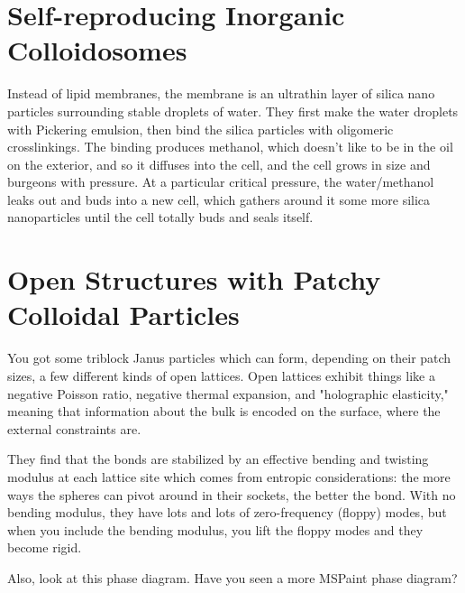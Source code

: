 \documentclass[11pt]{amsart}
\begin{document}
\section{Self-reproducing Inorganic Colloidosomes}
Instead of lipid membranes, the membrane is an ultrathin layer of silica nano particles surrounding stable droplets of water. They first make the water droplets with Pickering emulsion, then bind the silica particles with oligomeric crosslinkings. The binding produces methanol, which doesn't like to be in the oil on the exterior, and so it diffuses into the cell, and the cell grows in size and burgeons with pressure. At a particular critical pressure, the water/methanol leaks out and buds into a new cell, which gathers around it some more silica nanoparticles until the cell totally buds and seals itself.

\section{Open Structures with Patchy Colloidal Particles}
You got some triblock Janus particles which can form, depending on their patch sizes, a few different kinds of open lattices. Open lattices exhibit things like a negative Poisson ratio, negative thermal expansion, and "holographic elasticity," meaning that information about the bulk is encoded on the surface, where the external constraints are.

They find that the bonds are stabilized by an effective bending and twisting modulus at each lattice site which comes from entropic considerations: the more ways the spheres can pivot around in their sockets, the better the bond. With no bending modulus, they have lots and lots of zero-frequency (floppy) modes, but when you include the bending modulus, you lift the floppy modes and they become rigid.

Also, look at this phase diagram. Have you seen a more MSPaint phase diagram?
\end{document}

